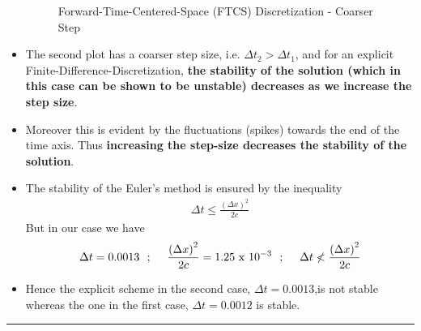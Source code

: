 \begin{itemize}
\begin{figure}[H]
\caption{Forward-Time-Centered-Space (FTCS) Discretization - Coarser Step }
\end{figure}
\item The second plot has a coarser step size, i.e. $\Delta t_2 > \Delta t_1$, and for an explicit Finite-Difference-Discretization, {\bf the stability of the solution (which in this case can be shown to be unstable) decreases as we increase the step size}. 
\item Moreover this is evident by the fluctuations (spikes) towards the end of the time axis. Thus {\bf increasing the step-size decreases the stability of the solution}.
\item The stability of the Euler's method is ensured by the inequality 
\begin{align*}
\Delta t \leq \frac{{(\Delta x)}^2}{2c}
\end{align*}
But in our case we have
\begin{align*}
\Delta t = 0.0013\ \ ; \ \ \ \ \frac{{(\Delta x)}^2}{2c} = 1.25\ {\rm x}\ 10^{-3} \ \ ; \ \ \ \ \Delta t \nless \frac{{(\Delta x)}^2}{2c} 
\end{align*}
\item Hence the explicit scheme in the second case, $\Delta t = 0.0013$,is not stable whereas the one in the first case, $\Delta t = 0.0012$ is stable. 
\end{itemize}\hrule\newpage
